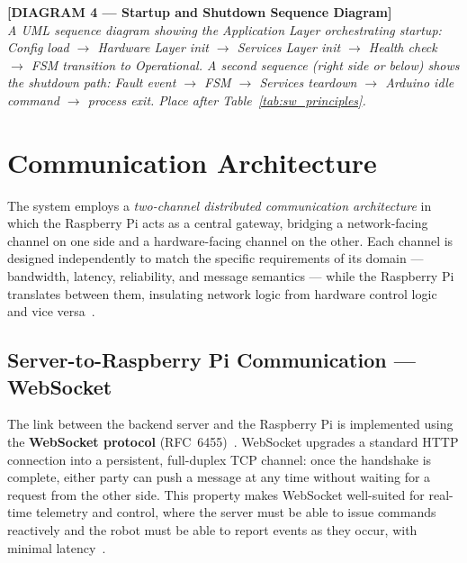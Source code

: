 \bigskip
\noindent\textbf{[DIAGRAM 4 — Startup and Shutdown Sequence Diagram]}\\
\textit{A UML sequence diagram showing the Application Layer
orchestrating startup: Config load $\rightarrow$ Hardware Layer init
$\rightarrow$ Services Layer init $\rightarrow$ Health check
$\rightarrow$ FSM transition to Operational. A second sequence
(right side or below) shows the shutdown path: Fault event
$\rightarrow$ FSM $\rightarrow$ Services teardown $\rightarrow$
Arduino idle command $\rightarrow$ process exit. Place after
Table~\ref{tab:sw_principles}.}
\bigskip

\section{Communication Architecture}
\label{sec:communication}
 
The system employs a \emph{two-channel distributed communication
architecture} in which the Raspberry Pi acts as a central gateway,
bridging a network-facing channel on one side and a hardware-facing
channel on the other. Each channel is designed independently to match
the specific requirements of its domain — bandwidth, latency,
reliability, and message semantics — while the Raspberry Pi
translates between them, insulating network logic from hardware
control logic and vice versa~\cite{tanenbaum2021networks}.
 
 
\subsection{Server-to-Raspberry Pi Communication — WebSocket}
 
The link between the backend server and the Raspberry Pi is
implemented using the \textbf{WebSocket protocol}
(RFC~6455)~\cite{fette2011websocket}. WebSocket upgrades a standard
HTTP connection into a persistent, full-duplex TCP channel: once the
handshake is complete, either party can push a message at any time
without waiting for a request from the other side. This property makes
WebSocket well-suited for real-time telemetry and control, where the
server must be able to issue commands reactively and the robot must be
able to report events as they occur, with minimal
latency~\cite{lubbers2011websocket}.
 
